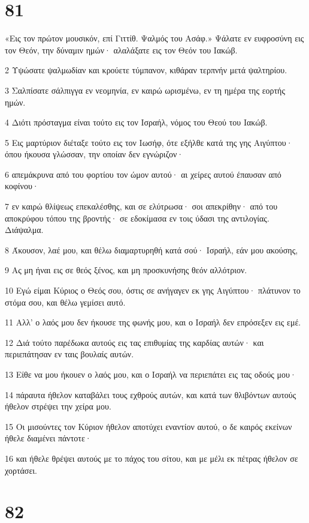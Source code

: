 \chapter{81}

\par «Εις τον πρώτον μουσικόν, επί Γιττίθ. Ψαλμός του Ασάφ.» Ψάλατε εν ευφροσύνη εις τον Θεόν, την δύναμιν ημών· αλαλάξατε εις τον Θεόν του Ιακώβ.
\par 2 Υψώσατε ψαλμωδίαν και κρούετε τύμπανον, κιθάραν τερπνήν μετά ψαλτηρίου.
\par 3 Σαλπίσατε σάλπιγγα εν νεομηνία, εν καιρώ ωρισμένω, εν τη ημέρα της εορτής ημών.
\par 4 Διότι πρόσταγμα είναι τούτο εις τον Ισραήλ, νόμος του Θεού του Ιακώβ.
\par 5 Εις μαρτύριον διέταξε τούτο εις τον Ιωσήφ, ότε εξήλθε κατά της γης Αιγύπτου· όπου ήκουσα γλώσσαν, την οποίαν δεν εγνώριζον·
\par 6 απεμάκρυνα από του φορτίου τον ώμον αυτού· αι χείρες αυτού έπαυσαν από κοφίνου·
\par 7 εν καιρώ θλίψεως επεκαλέσθης, και σε ελύτρωσα· σοι απεκρίθην· από του αποκρύφου τόπου της βροντής· σε εδοκίμασα εν τοις ύδασι της αντιλογίας. Διάψαλμα.
\par 8 Άκουσον, λαέ μου, και θέλω διαμαρτυρηθή κατά σού· Ισραήλ, εάν μου ακούσης,
\par 9 Ας μη ήναι εις σε θεός ξένος, και μη προσκυνήσης θεόν αλλότριον.
\par 10 Εγώ είμαι Κύριος ο Θεός σου, όστις σε ανήγαγεν εκ γης Αιγύπτου· πλάτυνον το στόμα σου, και θέλω γεμίσει αυτό.
\par 11 Αλλ' ο λαός μου δεν ήκουσε της φωνής μου, και ο Ισραήλ δεν επρόσεξεν εις εμέ.
\par 12 Διά τούτο παρέδωκα αυτούς εις τας επιθυμίας της καρδίας αυτών· και περιεπάτησαν εν ταις βουλαίς αυτών.
\par 13 Είθε να μου ήκουεν ο λαός μου, και ο Ισραήλ να περιεπάτει εις τας οδούς μου·
\par 14 πάραυτα ήθελον καταβάλει τους εχθρούς αυτών, και κατά των θλιβόντων αυτούς ήθελον στρέψει την χείρα μου.
\par 15 Οι μισούντες τον Κύριον ήθελον αποτύχει εναντίον αυτού, ο δε καιρός εκείνων ήθελε διαμένει πάντοτε·
\par 16 και ήθελε θρέψει αυτούς με το πάχος του σίτου, και με μέλι εκ πέτρας ήθελον σε χορτάσει.

\chapter{82}

